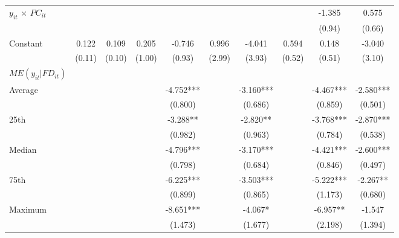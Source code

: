 \documentclass[12pt, a4paper]{article}
\begin{document}
\begin{table}[htbp]
\begin{threeparttable}
{\begin{tabular}{l*{9}{c}}
				$y_{it}$ $\times$ $PC_{it}$ &                     &                     &                     &                     &                     &                     &                     &      -1.385         &       0.575         \\
				&                     &                     &                     &                     &                     &                     &                     &      (0.94)         &      (0.66)         \\
				Constant            &       0.122         &       0.109         &       0.205         &      -0.746         &       0.996         &      -4.041         &       0.594         &       0.148         &      -3.040         \\
				&      (0.11)         &      (0.10)         &      (1.00)         &      (0.93)         &      (2.99)         &      (3.93)         &      (0.52)         &      (0.51)         &      (3.10)         \\
				\hline
				$ME(y_{it}|FD_{it})$ \\
				Average&&&&	-4.752***	&&	-3.160***	&&	-4.467***	&	-2.580***\\
				&&&&(0.800)	&&	(0.686)	&&	(0.859)	&	(0.501)\\
				
				25th&&&&	-3.288** &&		-2.820** 	&&	-3.768***&	-2.870***\\
				&&&&(0.982)	&&	(0.963)	&&	(0.784)	&	(0.538)\\
				
				Median&&&&	-4.796***	&&	-3.170***	&&	-4.421***	&	-2.600***\\
				&&&&(0.798)	&&	(0.684)	&&	(0.846)	&	(0.497)\\
				
				75th&&&&	-6.225***	&&	-3.503***	&&	-5.222***	&	-2.267** \\
				&&&&(0.899)	&&	(0.865)	&&	(1.173)	&	(0.680)\\
				
				Maximum&&&&	-8.651***&&		-4.067*  	&&	-6.957** 	&	-1.547\\
				&&&&(1.473)	&&	(1.677)	&&	(2.198)	&	(1.394)\\
				

\end{tabular}}
\end{threeparttable}
\end{table}
\end{document}

